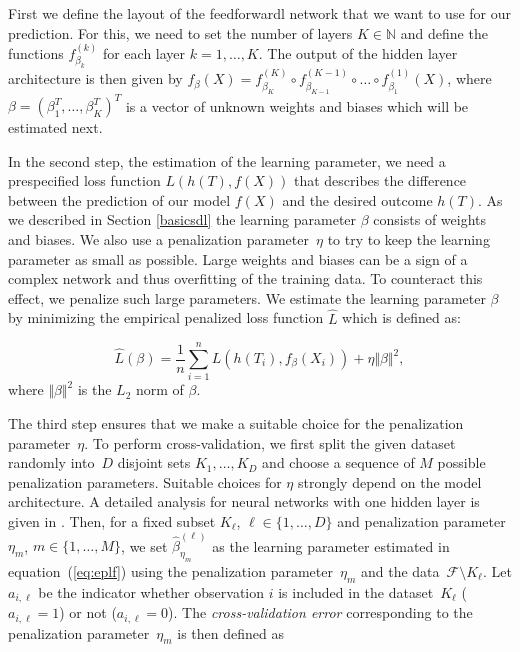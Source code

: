 \documentclass[12pt, a4paper]{scrartcl}
\theoremstyle{definition}
\theoremstyle{plain}
\numberwithin{equation}{section}
\numberwithin{figure}{section}
\numberwithin{table}{section}
\begin{document}
	First we define the layout of the feedforwardl network that we want to use for our prediction.
	For this, we need to set the number of layers $K\in \mathbb{N}$ and define the functions $f_{\beta_k}^{(k)}$ for each layer $k = 1, \dots, K$.
	The output of the hidden layer architecture is then given by $f_{\beta}(X) = f_{\beta_K}^{(K)} \circ f_{\beta_{K-1}}^{(K-1)} \circ \dots \circ f_{\beta_1}^{(1)}(X)$, where $\beta = (\beta_1^T, \dots, \beta_K^T)^T$ is a vector of unknown weights and biases which will be estimated next.
	
	In the second step, the estimation of the learning parameter, we need a prespecified loss function $L(h(T), f(X))$ that describes the difference between the prediction of our model $f(X)$ and the desired outcome $h(T)$.
	As we described in Section \ref{basicsdl} the learning parameter $\beta$ consists of weights and biases.
	We also use a penalization parameter~$\eta$ to try to keep the learning parameter as small as possible.
	Large weights and biases can be a sign of a complex network and thus overfitting of the training data.
	To counteract this effect, we penalize such large parameters.
	We estimate the learning parameter $\beta$ by minimizing the empirical penalized loss function $\hat{L}$ which is defined as:
	
	\begin{equation}\label{eq:eplf}
	\hat{L}(\beta) = \frac{1}{n} \sum_{i=1}^n L( h(T_i), f_{\beta}(X_i)) + \eta \Vert \beta \Vert ^2,
	\end{equation}
	where $\Vert \beta \Vert ^2$ is the $L_2$ norm of $\beta$.
	
	The third step ensures that we make a suitable choice for the penalization parameter~$\eta$.
	To perform cross-validation, we first split the given dataset randomly into~$D$ disjoint sets $K_1,\dots, K_D$ and choose a sequence of $M$ possible penalization parameters.
	Suitable choices for $\eta$ strongly depend on the model architecture.
	A detailed analysis for neural networks with one hidden layer is given in \citet*{regpar}. 
	Then, for a fixed subset $K_{\ell}$, $\ell \in \{1,\dots,D\}$ and penalization parameter $\eta_m$, $m \in \{1,\dots,M\}$, we set $\hat{\beta}_{\eta_{m}}^{(\ell)}$ as the learning parameter estimated in equation~(\ref{eq:eplf}) using the penalization parameter~$\eta_m$ and the data~$\mathcal{F} \setminus K_{\ell}$.
	Let $a_{i,\ell}$ be the indicator whether observation $i$ is included in the dataset~$K_\ell$ ($a_{i,\ell} = 1$) or not ($a_{i,\ell}=0$).
	The \emph{cross-validation error} corresponding to the penalization parameter~$\eta_m$ is then defined as
	
\end{document}
